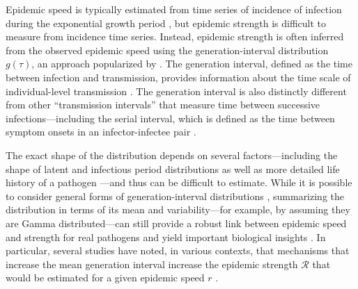 \documentclass[12pt]{article}
\newcommand{\RR}{\ensuremath{{\mathcal R}}\xspace}
\begin{document}
Epidemic speed is typically estimated from time series of incidence of infection during the exponential growth period \citep{mills2004transmissibility,nishiura2009transmission,ma2014estimating}, but epidemic strength is difficult to measure from incidence time series.
Instead, epidemic strength is often inferred from the observed epidemic speed using the generation-interval distribution $g(\tau)$, an approach popularized by \citep{wallinga2007generation}.
The generation interval, defined as the time between infection and transmission, provides information about the time scale of individual-level transmission \citep{svensson2007note}.
The generation interval is also distinctly different from other ``transmission intervals'' that measure time between successive infections---including the serial interval, which is defined as the time between symptom onsets in an infector-infectee pair \citep{fine2003interval,grassly2008mathematical,britton2019estimation,ali2020serial,park2021forward}.

The exact shape of the distribution depends on several factors---including the shape of latent and infectious period distributions \citep{lloyd2001realistic,wearing2005appropriate,roberts2007model} as well as more detailed life history of a pathogen \citep{huber2016quantitative}---and thus can be difficult to estimate.
While it is possible to consider general forms of generation-interval distributions \citep{miller2010epidemics,svensson2015influence}, summarizing the distribution in terms of its mean and variability---for example, by assuming they are Gamma distributed---can still provide a robust link between epidemic speed and strength for real pathogens and yield important biological insights \citep{park2019practical}.
In particular, several studies have noted, in various contexts, that mechanisms that increase the mean generation interval increase the epidemic strength $\RR$ that would be estimated for a given epidemic speed $r$ \citep{eaton2014proportion,powers2014impact,weitz2015modeling,park2020time}.
\end{document}
